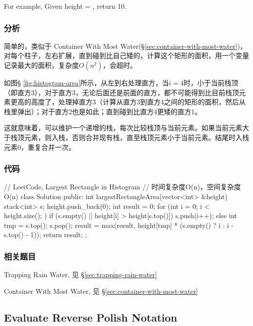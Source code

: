 For example,
Given height = \fn{[2,1,5,6,2,3]},
return 10.


\subsubsection{分析}
简单的，类似于 Container With Most Water(\S \ref{sec:container-with-most-water})，对每个柱子，左右扩展，直到碰到比自己矮的，计算这个矩形的面积，用一个变量记录最大的面积，复杂度$O(n^2)$，会超时。

如图\S 
\ref{fig:histogram-area}所示，从左到右处理直方，当$i=4$时，小于当前栈顶（即直方3），对于直方3，无论后面还是前面的直方，都不可能得到比目前栈顶元素更高的高度了，处理掉直方3（计算从直方3到直方4之间的矩形的面积，然后从栈里弹出）；对于直方2也是如此；直到碰到比直方4更矮的直方1。

这就意味着，可以维护一个递增的栈，每次比较栈顶与当前元素。如果当前元素大于栈顶元素，则入栈，否则合并现有栈，直至栈顶元素小于当前元素。结尾时入栈元素0，重复合并一次。


\subsubsection{代码}
\begin{Code}
	// LeetCode, Largest Rectangle in Histogram
	// 时间复杂度O(n)，空间复杂度O(n)
	class Solution {
		public:
		int largestRectangleArea(vector<int> &height) {
			stack<int> s;
			height.push_back(0);
			int result = 0;
			for (int i = 0; i < height.size(); ) {
				if (s.empty() || height[i] > height[s.top()])
				s.push(i++);
				else {
					int tmp = s.top();
					s.pop();
					result = max(result,
					height[tmp] * (s.empty() ? i : i - s.top() - 1));
				}
			}
			return result;
		}
	};
\end{Code}


\subsubsection{相关题目}
\begindot
\item Trapping Rain Water, 见 \S \ref{sec:trapping-rain-water}
\item Container With Most Water, 见 \S \ref{sec:container-with-most-water}
\myenddot


\subsection{Evaluate Reverse Polish Notation} %
\label{sec:Evaluate-Reverse-Polish-Notation}


